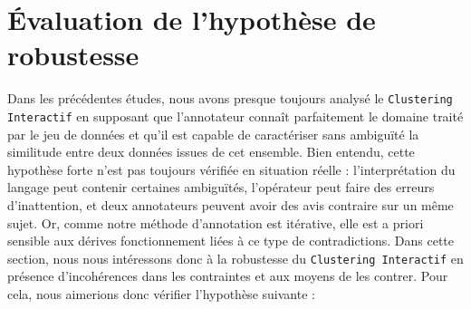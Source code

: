 \section{Évaluation de l'hypothèse de robustesse}
\label{section:4.6-HYPOTHESE-ROBUSTESSE}

	Dans les précédentes études, nous avons presque toujours analysé le \texttt{Clustering Interactif} en supposant que l'annotateur connaît parfaitement le domaine traité par le jeu de données et qu'il est capable de caractériser sans ambiguïté la similitude entre deux données issues de cet ensemble.
	Bien entendu, cette hypothèse forte n'est pas toujours vérifiée en situation réelle : l'interprétation du langage peut contenir certaines ambiguïtés, l'opérateur peut faire des erreurs d'inattention, et deux annotateurs peuvent avoir des avis contraire sur un même sujet.
	Or, comme notre méthode d'annotation est itérative, elle est a priori sensible aux dérives fonctionnement liées à ce type de contradictions.
	Dans cette section, nous nous intéressons donc à la robustesse du \texttt{Clustering Interactif} en présence d'incohérences dans les contraintes et aux moyens de les contrer.
	Pour cela, nous aimerions donc vérifier l'hypothèse suivante :
	
